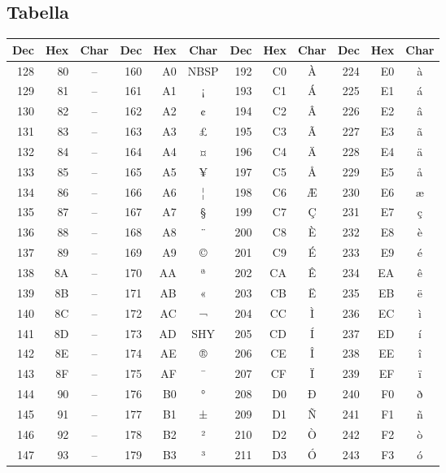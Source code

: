 \subsection{Tabella }
\begin{table}[htbp]
\centering
\small
\begin{tabular}{rrc|rrc|rrc|rrc}
\toprule
\textbf{Dec} & \textbf{Hex} & \textbf{Char} & \textbf{Dec} & \textbf{Hex} & \textbf{Char} & \textbf{Dec} & \textbf{Hex} & \textbf{Char} & \textbf{Dec} & \textbf{Hex} & \textbf{Char} \\
\midrule
128 & 80 & -- & 160 & A0 & NBSP & 192 & C0 & À & 224 & E0 & à \\
129 & 81 & -- & 161 & A1 & ¡ & 193 & C1 & Á & 225 & E1 & á \\
130 & 82 & -- & 162 & A2 & ¢ & 194 & C2 & Â & 226 & E2 & â \\
131 & 83 & -- & 163 & A3 & £ & 195 & C3 & Ã & 227 & E3 & ã \\
132 & 84 & -- & 164 & A4 & ¤ & 196 & C4 & Ä & 228 & E4 & ä \\
133 & 85 & -- & 165 & A5 & ¥ & 197 & C5 & Å & 229 & E5 & å \\
134 & 86 & -- & 166 & A6 & ¦ & 198 & C6 & Æ & 230 & E6 & æ \\
135 & 87 & -- & 167 & A7 & § & 199 & C7 & Ç & 231 & E7 & ç \\
136 & 88 & -- & 168 & A8 & ¨ & 200 & C8 & È & 232 & E8 & è \\
137 & 89 & -- & 169 & A9 & © & 201 & C9 & É & 233 & E9 & é \\
138 & 8A & -- & 170 & AA & ª & 202 & CA & Ê & 234 & EA & ê \\
139 & 8B & -- & 171 & AB & « & 203 & CB & Ë & 235 & EB & ë \\
140 & 8C & -- & 172 & AC & ¬ & 204 & CC & Ì & 236 & EC & ì \\
141 & 8D & -- & 173 & AD & SHY & 205 & CD & Í & 237 & ED & í \\
142 & 8E & -- & 174 & AE & ® & 206 & CE & Î & 238 & EE & î \\
143 & 8F & -- & 175 & AF & ¯ & 207 & CF & Ï & 239 & EF & ï \\
144 & 90 & -- & 176 & B0 & ° & 208 & D0 & Ð & 240 & F0 & ð \\
145 & 91 & -- & 177 & B1 & ± & 209 & D1 & Ñ & 241 & F1 & ñ \\
146 & 92 & -- & 178 & B2 & ² & 210 & D2 & Ò & 242 & F2 & ò \\
147 & 93 & -- & 179 & B3 & ³ & 211 & D3 & Ó & 243 & F3 & ó \\

\end{tabular}
\end{table}
